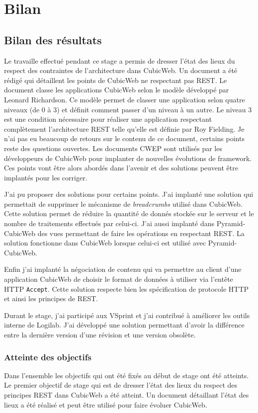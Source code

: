 \chapter{Bilan} 
\section{Bilan des résultats} 
Le travaille effectué pendant ce stage a permis de dresser l'état des lieux 
du respect des contraintes de l'architecture  dans 
CubicWeb. Un document  a été rédigé qui détaillent les 
points de CubicWeb ne respectant pas REST. Le document classe les applications 
CubicWeb selon le modèle développé par Leonard Richardson\cite{rmm}. Ce modèle 
permet de classer une application selon quatre niveaux (de 0 à 3) et définit 
comment passer d'un niveau à un autre. Le niveau 3 est une condition nécessaire 
pour réaliser une application respectant complètement l'architecture REST telle 
qu'elle est définie par Roy Fielding. Je n'ai pas eu beaucoup de retours sur le 
contenu de ce document, certains points reste des questions ouvertes. Les 
documents CWEP sont utilisés par les développeurs de CubicWeb pour implanter de 
nouvelles évolutions de framework. Ces points vont être alors abordés dans 
l'avenir et des solutions peuvent être implantés pour les corriger. 

J'ai pu proposer des solutions pour certains points. J'ai implanté une solution
qui permettait de supprimer le mécanisme de \textit{breadcrumbs} utilisé dans
CubicWeb. Cette solution permet de réduire la quantité de donnés stockée sur le
serveur et le nombre de traitements effectués par celui-ci. J'ai aussi implanté
dans Pyramid-CubicWeb des vues permettant de faire les opérations
 en respectant REST. La solution fonctionne dans CubicWeb
lorsque celui-ci est utilisé avec Pyramid-CubicWeb. 

Enfin j'ai implanté la négociation de contenu qui va permettre au client d'une
application CubicWeb de choisir le format de données à utiliser via l'entête
HTTP \texttt{Accept}. Cette solution respecte bien les spécification de
protocole HTTP et ainsi les principes de REST. 

Durant le stage, j'ai participé aux VSprint et j'ai contribué à améliorer les
outils interne de Logilab. J'ai développé une solution permettant d'avoir la
différence entre la dernière version d'une révision et une version obsolète.

\subsection{Atteinte des objectifs} 
Dans l'ensemble les objectifs qui ont été fixés au début de stage ont été atteints. 
Le premier objectif de stage qui est de dresser l'état des lieux du respect des 
principes REST dans CubicWeb a été atteint. Un document détaillant l'état des lieux 
a été réalisé et peut être utilisé pour faire évoluer CubicWeb. 

